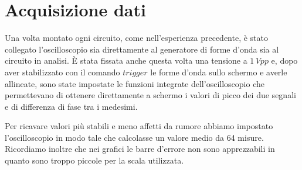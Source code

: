 \section{Acquisizione dati}
Una volta montato ogni circuito, come nell'esperienza precedente, è stato collegato l'oscilloscopio sia direttamente al generatore di forme d'onda sia al circuito in analisi. 
\`E stata fissata anche questa volta una tensione a $1\,Vpp$ e, dopo aver stabilizzato con il comando $trigger$ le forme d'onda sullo schermo e averle allineate, sono state impostate le funzioni integrate dell'oscilloscopio che permettevano di ottenere direttamente a schermo i valori di picco dei due segnali e di differenza di fase tra i medesimi.

Per ricavare valori più stabili e meno affetti da rumore abbiamo impostato l'oscilloscopio in modo tale che calcolasse un valore medio da 64 misure.
Ricordiamo inoltre che nei grafici le barre d'errore non sono apprezzabili in quanto sono troppo piccole per la scala utilizzata. \phantom{trolololololololololotrolololololololololotrolololololololololotrololo}